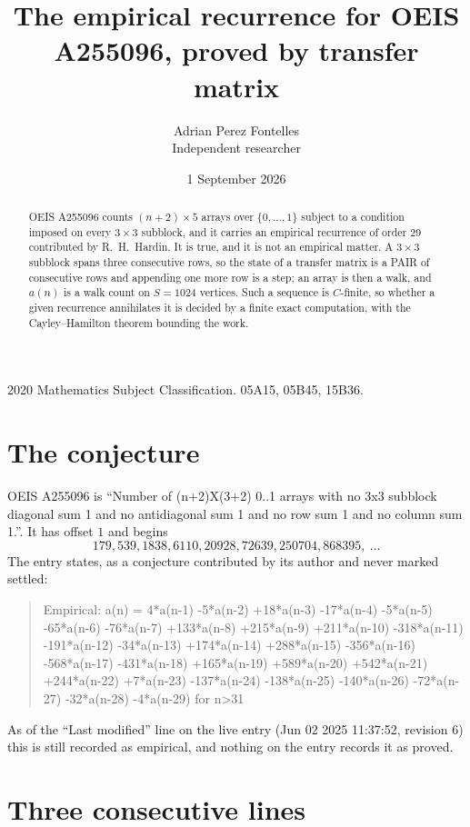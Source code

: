 \documentclass[11pt,a4paper]{article}
\title{The empirical recurrence for OEIS A255096, proved by transfer matrix}
\author{Adrian Perez Fontelles\\ \small Independent researcher}
\date{1 September 2026}
\theoremstyle{plain}
\theoremstyle{definition}
\begin{document}
\maketitle

\begin{abstract}
OEIS A255096 counts $(n+2)\times5$ arrays over $\{0,\dots,1\}$ subject to a condition imposed on
every $3\times3$ subblock, and it carries an empirical recurrence of order $29$
contributed by R.~H.~Hardin. It is true, and it is not an empirical matter. A $3\times3$
subblock spans three consecutive rows, so the state of a transfer matrix is a PAIR of
consecutive rows and appending one more row is a step; an array is then a walk, and
$a(n)$ is a walk count on $S=1024$ vertices. Such a sequence is $C$-finite, so whether a given
recurrence annihilates it is decided by a finite exact computation, with the Cayley--Hamilton
theorem bounding the work.
\end{abstract}

\noindent\small 2020 Mathematics Subject Classification. 05A15, 05B45, 15B36.\normalsize

\section{The conjecture}

OEIS A255096 is ``Number of (n+2)X(3+2) 0..1 arrays with no 3x3 subblock diagonal sum 1 and no antidiagonal sum 1 and no row sum 1 and no column sum 1.''. It has offset $1$ and begins
\[
179, 539, 1838, 6110, 20928, 72639, 250704, 868395,\ \dots
\]
The entry states, as a conjecture contributed by its author and never marked settled:
\begin{quote}
Empirical: a(n) = 4*a(n-1) -5*a(n-2) +18*a(n-3) -17*a(n-4) -5*a(n-5) -65*a(n-6) -76*a(n-7) +133*a(n-8) +215*a(n-9) +211*a(n-10) -318*a(n-11) -191*a(n-12) -34*a(n-13) +174*a(n-14) +288*a(n-15) -356*a(n-16) -568*a(n-17) -431*a(n-18) +165*a(n-19) +589*a(n-20) +542*a(n-21) +244*a(n-22) +7*a(n-23) -137*a(n-24) -138*a(n-25) -140*a(n-26) -72*a(n-27) -32*a(n-28) -4*a(n-29) for n>31
\end{quote}
As of the ``Last modified'' line on the live entry (Jun 02 2025 11:37:52, revision 6) this is still
recorded as empirical, and nothing on the entry records it as proved.

\section{Three consecutive lines}
\end{document}
